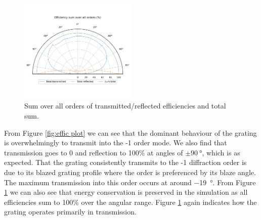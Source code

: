 \documentclass[a4paper,12pt]{scrartcl}
\begin{document}
\begin{figure}[!h]
    \centering
    \includegraphics[width=0.5\textwidth]{figures/sum_efficiencies_plot.png}
    \caption{Sum over all orders of transmitted/reflected efficiencies and total sum.}
    \label{fig:sum effic plot}
\end{figure}
From Figure \ref{fig:effic plot} we can see that the dominant behaviour of the grating is overwhelmingly to transmit into the -1 order mode. We also find that transmission goes to 0 and reflection to 100\% at angles of $\pm\SI{90}{\degree}$, which is as expected. That the grating consistently transmits to the -1 diffraction order is due to its blazed grating profile where the order is preferenced by its blaze angle. The maximum transmission into this order occurs at around \SI{-19}{\degree}. From Figure \ref{fig:sum effic plot} we can also see that energy conservation is preserved in the simulation as all efficiencies sum to 100\% over the angular range. Figure \ref{fig:sum effic plot} again indicates how the grating operates primarily in transmission. 
\end{document}
